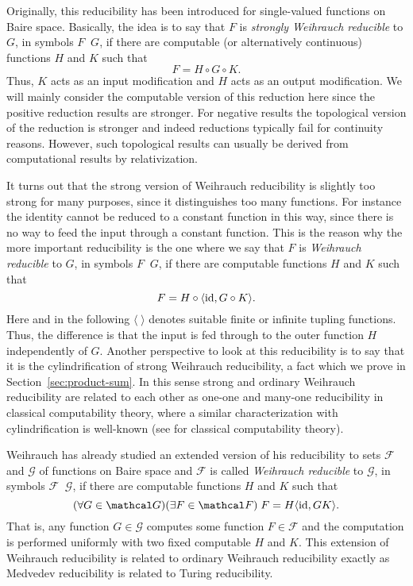 \documentclass[jsl,10pt]{noasl}
\def\FF{{\mathcal F}}
\def\GG{{\mathcal G}}
\def\id{{\rm id}}
\def\leqW{\mathop{\leq_{\mathrm{W}}}}
\def\leqSW{\mathop{\leq_{\mathrm{sW}}}}
\begin{document}
Originally, this reducibility has been introduced for single-valued functions on Baire space.
Basically, the idea is to say that $F$ is {\em strongly Weihrauch reducible} to $G$, 
in symbols $F\leqSW G$, if there
are computable (or alternatively continuous) functions $H$ and $K$ such that
\[F=H\circ G\circ K.\]
Thus, $K$ acts as an input modification and $H$ acts as an output modification.
We will mainly consider the computable version of this reduction here since
the positive reduction results are stronger. For negative results the topological version
of the reduction is stronger and indeed reductions typically fail for continuity reasons.
However, such topological results can usually be derived from computational results by relativization.

It turns out that the strong version of Weihrauch reducibility is slightly
too strong for many purposes, since it distinguishes too many functions. 
For instance the identity cannot be reduced to a constant function in this
way, since there is no way to feed the input through a constant function.
This is the reason why the more important reducibility is the one where we
say that $F$ is {\em Weihrauch reducible} to $G$, in symbols $F\leqW G$,
if there are computable functions $H$ and $K$ such that
\[F=H\circ\langle\id,G\circ K\rangle.\]
Here and in the following $\langle\;\rangle$ denotes suitable finite
or infinite tupling functions.
Thus, the difference is that the input is fed through to the outer function $H$
independently of $G$. Another perspective to look at this reducibility is
to say that it is the cylindrification of strong Weihrauch reducibility,
a fact which we prove in Section~\ref{sec:product-sum}.
In this sense strong and ordinary Weihrauch reducibility are related to each
other as one-one and many-one reducibility in classical computability theory,
where a similar characterization with cylindrification is well-known 
(see \cite{Soa87,Odi89} for classical computability theory).

Weihrauch \cite{Wei92a,Wei92c} has already studied an extended version of his reducibility to sets $\FF$ and $\GG$
of functions on Baire space and $\FF$ is called {\em Weihrauch reducible} to $\GG$,
in symbols $\FF\leqW\GG$, if there are computable functions $H$ and $K$ such that
\[(\forall G\in\GG)(\exists F\in\FF)\;F=H\langle\id,GK\rangle.\]
That is, any function $G\in\GG$ computes some function $F\in\FF$ and
the computation is performed uniformly with two fixed computable $H$ and $K$.
This extension of Weihrauch reducibility is related to ordinary
Weihrauch reducibility exactly as Medvedev reducibility is related
to Turing reducibility. 
\end{document}
